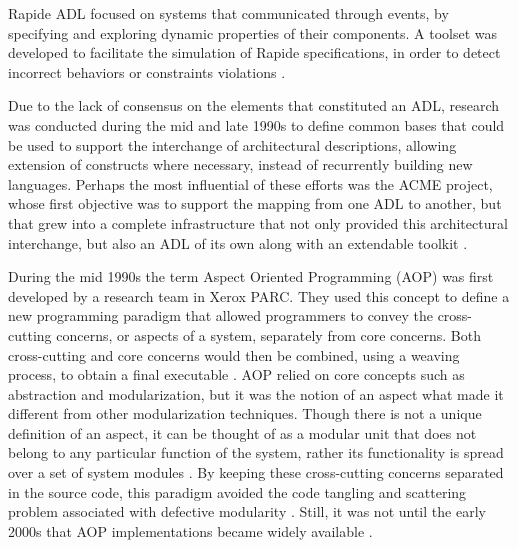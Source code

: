 \documentclass[10pt]{article}
\begin{document}
Rapide ADL focused on systems that communicated through events, by specifying and exploring dynamic properties of their components. A toolset was developed to facilitate the simulation of Rapide specifications, in order to detect incorrect behaviors or constraints violations \cite{Dashofy07}.

Due to the lack of consensus on the elements that constituted an ADL, research was conducted during the mid and late 1990s to define common bases that could be used to support the interchange of architectural descriptions, allowing extension of constructs where necessary, instead of recurrently building new languages. Perhaps the most influential of these efforts was the ACME project, whose first objective was to support the mapping from one ADL to another, but that grew into a complete infrastructure that not only provided this architectural interchange, but also an ADL of its own along with an extendable toolkit \cite{Garlan00}.

During the mid 1990s the term Aspect Oriented Programming (AOP) was first developed by a research team in Xerox PARC. They used this concept to define a new programming paradigm that allowed programmers to convey the cross-cutting concerns, or aspects of a system, separately from core concerns. Both cross-cutting and core concerns would then be combined, using a weaving process, to obtain a final executable \cite{Kickzales97}. AOP relied on core concepts such as abstraction and modularization, but it was the notion of an aspect what made it different from other modularization techniques. Though there is not a unique definition of an aspect, it can be thought of as a modular unit that does not belong to any particular function of the system, rather its functionality is spread over a set of system modules \cite{Kickzales97}. By keeping these cross-cutting concerns separated in the source code, this paradigm avoided the code tangling and scattering problem associated with defective modularity \cite{Laddad09}. Still, it was not until the early 2000s that AOP implementations became widely available \cite{Laddad09}.
\end{document}
